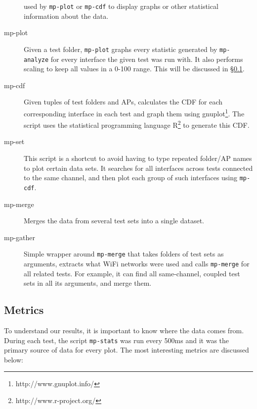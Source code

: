 \begin{description}
    used by \texttt{mp-plot} or \texttt{mp-cdf} to display graphs or other
    statistical information about the data.
  \item[mp-plot]
    Given a test folder, \texttt{mp-plot} graphs every statistic generated
    by \texttt{mp-analyze} for every interface the given test was run with. It
    also performs scaling to keep all values in a 0-100 range. This will be
    discussed in \S\ref{sec:met:metrics}.
  \item[mp-cdf]
    Given tuples of test folders and APs, calculates the CDF for each
    corresponding interface in each test and graph them using
    gnuplot\footnote{http://www.gnuplot.info/}. The script uses the statistical
    programming language R\footnote{http://www.r-project.org/} to generate this
    CDF.
  \item[mp-set]
    This script is a shortcut to avoid having to type repeated folder/AP names
    to plot certain data sets. It searches for all interfaces across tests
    connected to the same channel, and then plot each group of such interfaces
    using \texttt{mp-cdf}.
  \item[mp-merge]
    Merges the data from several test sets into a single dataset.
  \item[mp-gather]
    Simple wrapper around \texttt{mp-merge} that takes folders of test sets as
    arguments, extracts what WiFi networks were used and calls \texttt{mp-merge}
    for all related tests. For example, it can find all same-channel, coupled
    test sets in all its arguments, and merge them.
\end{description}

\subsection{Metrics}
\label{sec:met:metrics}
To understand our results, it is important to know where the data comes from.
During each test, the script \texttt{mp-stats} was run every 500ms and it was the
primary source of data for every plot. The most interesting metrics are
discussed below:


